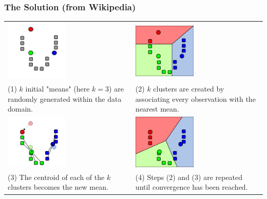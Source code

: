\documentclass[rgb,dvipsnames]{beamer}
\begin{document}
\begin{frame}
  \frametitle{The Solution (from Wikipedia)}
  \footnotesize
  \begin{tabular}{p{5cm}p{5cm}}
    \includegraphics[width=3cm]{img/kmeans1.png} & \includegraphics[width=3cm]{img/kmeans2.png} \\

    (1) $k$ initial "means" (here $k=3$) are randomly generated within the data domain. &

    (2) $k$ clusters are created by associating every observation with the nearest mean.\\

    \includegraphics[width=3cm]{img/kmeans3.png} & \includegraphics[width=3cm]{img/kmeans4.png} \\

    (3) The centroid of each of the $k$ clusters becomes the new mean. &

    (4) Steps (2) and (3) are repeated until convergence has been reached.
  \end{tabular}
\end{frame}
\end{document}
